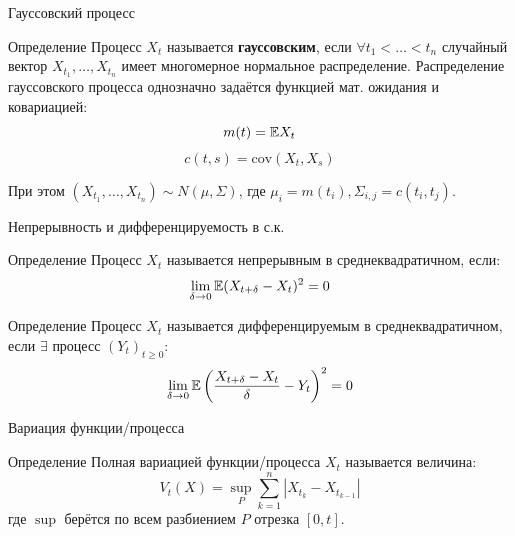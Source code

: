 \documentclass[aspectratio=169]{beamer}
\begin{document}
\begin{frame}{Гауссовский процесс}
    \begin{block}{Определение}
        Процесс $X_t$ называется \textbf{гауссовским}, если $\forall t_1 < \ldots < t_n$ случайный вектор $X_{t_1}, \ldots, X_{t_n}$ имеет многомерное нормальное распределение.
        Распределение гауссовского процесса однозначно задаётся функцией мат. ожидания и ковариацией:
        $$
            m(t) = \mathbb{E} X_t
        $$
        $$
            c(t, s) = \mathrm{cov}(X_t, X_s)
        $$

        При этом $\left(X_{t_1}, \ldots, X_{t_n}\right) \sim N(\mu, \Sigma)$, где $\mu_i = m(t_i), \Sigma_{i,j} = c(t_i, t_j)$.
    \end{block}
\end{frame}


\begin{frame}{Непрерывность и дифференцируемость в с.к.}
    \begin{block}{Определение}
        Процесс $X_t$ называется непрерывным в среднеквадратичном, если:
        $$
            \lim_{\delta \to 0} \mathbb{E}(X_{t+\delta} - X_t)^2 = 0
        $$
    \end{block}
    \begin{block}{Определение}
        Процесс $X_t$ называется дифференцируемым в среднеквадратичном, если $\exists$ процесс $(Y_t)_{t\geq 0}$:
        $$
            \lim_{\delta \to 0} \mathbb{E} \left(\dfrac{X_{t+\delta} - X_t}{\delta} - Y_t\right)^2 = 0
        $$
    \end{block}
\end{frame}

\begin{frame}{Вариация функции/процесса}
    \begin{block}{Определение}
        Полная вариацией функции/процесса $X_t$ называется величина:
        $$
            V_t(X) = \sup_{P} \sum_{k=1}^n |X_{t_k} - X_{t_{k-1}}|
        $$где $\sup$ берётся по всем разбиением $P$ отрезка $[0, t]$.
    \end{block} 
\end{frame}
\end{document}
